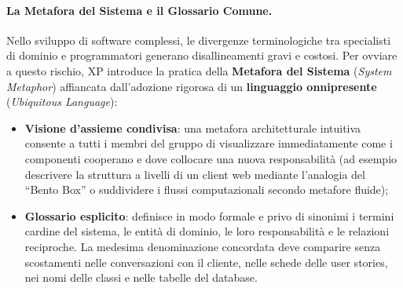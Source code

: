 \documentclass[12pt]{extarticle}
\begin{document}
\paragraph{La Metafora del Sistema e il Glossario Comune.}
Nello sviluppo di software complessi, le divergenze terminologiche tra specialisti di dominio e programmatori generano disallineamenti gravi e costosi. Per ovviare a questo rischio, XP introduce la pratica della \textbf{Metafora del Sistema} (\textit{System Metaphor}) affiancata dall'adozione rigorosa di un \textbf{linguaggio onnipresente} (\textit{Ubiquitous Language}):
\begin{itemize}
    \item \textbf{Visione d'assieme condivisa}: una metafora architetturale intuitiva consente a tutti i membri del gruppo di visualizzare immediatamente come i componenti cooperano e dove collocare una nuova responsabilità (ad esempio descrivere la struttura a livelli di un client web mediante l'analogia del ``Bento Box'' o suddividere i flussi computazionali secondo metafore fluide);
    \item \textbf{Glossario esplicito}: definisce in modo formale e privo di sinonimi i termini cardine del sistema, le entità di dominio, le loro responsabilità e le relazioni reciproche. La medesima denominazione concordata deve comparire senza scostamenti nelle conversazioni con il cliente, nelle schede delle user stories, nei nomi delle classi e nelle tabelle del database.
\end{itemize}
\end{document}
